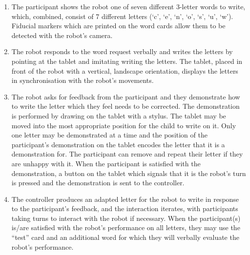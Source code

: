 \documentclass{sig-alternate}
\begin{document}
\begin{enumerate}

    \item The participant shows the robot one of seven different 3-letter words
        to write, which, combined, consist of 7 different letters (`c', `e',
        `n', `o', `s', `u', `w'). Fiducial markers which are printed on the word
        cards allow them to be detected with the robot's camera. 

    \item The robot responds to the word request verbally and writes the
        letters by pointing at the tablet and imitating writing the letters. The
        tablet, placed in front of the robot with a vertical, landscape orientation,
        displays the letters in synchronisation with the robot's movements. 

    \item The robot asks for feedback from the participant and they demonstrate
        how to write the letter which they feel needs to be corrected. The
        demonstration is performed by drawing on the tablet with a stylus. The
        tablet may be moved into the most appropriate position for the child to
        write on it. Only one letter may be demonstrated at a time and the
        position of the participant's demonstration on the tablet encodes the
        letter that it is a demonstration for. The participant can remove and
        repeat their letter if they are unhappy with it.
        When the participant is satisfied with the demonstration, a button on
        the tablet which signals that it is the robot's turn is pressed and the
        demonstration is sent to the controller.

    \item The controller produces an adapted letter for the robot to write in
        response to the participant's feedback, and the interaction iterates,
        with participants taking turns to interact with the robot if necessary.
        When the participant(s) is/are satisfied with the robot's performance on 
	all letters,
        they may use the ``test'' card and an additional word for which they will
        verbally evaluate the robot's performance. 

\end{enumerate}

	
\end{document}
